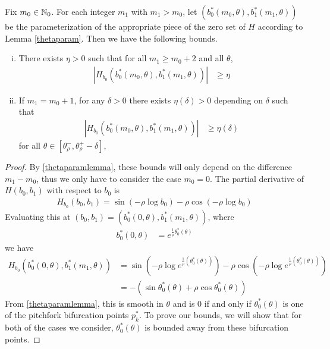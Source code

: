 \documentclass[thesis.tex]{subfiles}
\begin{document}

\begin{lemma}\label{Hderivboundslemma}
Fix $m_0 \in \mathbb{N}_0$. For each integer $m_1$ with $m_1 > m_0$, let $(b_0^*(m_0, \theta), b_1^*(m_1, \theta))$ be the parameterization of the appropriate piece of the zero set of $H$ according to Lemma \ref{thetaparam}. Then we have the following bounds.
\begin{enumerate}[(i)]
\item There exists $\eta > 0$ such that for all $m_1 \geq m_0 + 2$ and all $\theta$,
\begin{align}\label{Hderivbound}
| H_{b_0}(b_0^*(m_0, \theta), b_1^*(m_1, \theta)) | &\geq \eta
\end{align}
\item If $m_1 = m_0 + 1$, for any $\delta > 0$ there exists $\eta(\delta) > 0$ depending on $\delta$ such that
\begin{align}\label{Hderivbound2}
| H_{b_0}(b_0^*(m_0, \theta), b_1^*(m_1, \theta)) | &\geq \eta(\delta)
\end{align}
for all $\theta \in [\theta_\rho^-, \theta_\rho^+ - \delta]$,
\end{enumerate}

\begin{proof}
By \cref{thetaparamlemma}, these bounds will only depend on the difference $m_1 - m_0$, thus we only have to consider the case $m_0 = 0$. The partial derivative of $H(b_0, b_1)$ with respect to $b_0$ is
\begin{align}\label{Hb0}
H_{b_0} (b_0, b_1) = \sin(-\rho \log b_0) - \rho \cos(-\rho \log b_0)
\end{align}
Evaluating this at $(b_0, b_1) = (b_0^*(0, \theta), b_1^*(m_1, \theta))$, where
\begin{align}\label{b0starexp}
b_0^*(0, \theta) &= e^{\frac{1}{\rho} \theta_0^*(\theta) }
\end{align}
we have
\begin{align*}
H_{b_0}(b_0^*(0, \theta), b_1^*(m_1, \theta)) &= \sin\left(-\rho \log e^{\frac{1}{\rho}(\theta_0^*(\theta))} \right) - \rho \cos\left(-\rho \log e^{\frac{1}{\rho}(\theta_0^*(\theta))} \right) \\
&= -\left( \sin \theta_0^*(\theta) + \rho \cos \theta_0^*(\theta) \right)
\end{align*}
From \cref{thetaparamlemma}, this is smooth in $\theta$ and is 0 if and only if $\theta_0^*(\theta)$ is one of the pitchfork bifurcation points $p_k^*$. To prove our bounds, we will show that for both of the cases we consider, $\theta_0^*(\theta)$ is bounded away from these bifurcation points.  


\end{proof}
\end{lemma}
\end{document}
